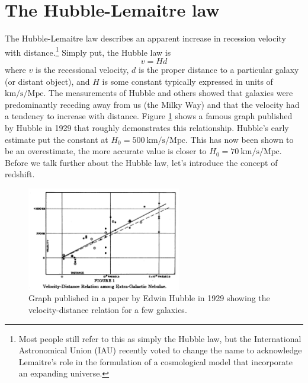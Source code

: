 \documentclass[a4paper,12pt]{article}
\theoremstyle{remark}
\newcommand{\mrm}[1]{\mathrm{#1}}
\renewcommand{\=}[1]{\stackrel{#1}{=}} %
\theoremstyle{plain}
\theoremstyle{definition}
\begin{document}
\section{The Hubble-Lemaitre law}
The Hubble-Lemaitre law describes an apparent increase in recession velocity with distance.\footnote{Most people still refer to this as simply the Hubble law, but the International Astronomical Union (IAU) recently voted to change the name to acknowledge Lemaitre's role in the formulation of a cosmological model that incorporate an expanding universe.} Simply put, the Hubble law is
\begin{equation}
v = H d
\end{equation}
where $v$ is the recessional velocity, $d$ is the proper distance to a particular galaxy (or distant object), and $H$ is some constant typically expressed in units of $\mrm{km /  s / Mpc}$. The measurements of Hubble and others showed that galaxies were predominantly receding away from us (the Milky Way) and that the velocity had a tendency to increase with distance. Figure \ref{fig:hubble} shows a famous graph published by Hubble in 1929 that roughly demonstrates this relationship. Hubble's early estimate put the constant at $H_0 = 500 \: \mrm{km /  s / Mpc}$. This has now been shown to be an overestimate, the more accurate value is closer to $H_0 = 70 \:\mrm{km /  s / Mpc}$. Before we talk further about the Hubble law, let's introduce the concept of redshift. 

\begin{figure}[t]
\begin{center}
    \includegraphics*[angle=0,width=0.6\textwidth]{img/hubble_relation.png}
    \caption[Insert text]{Graph published in a paper by Edwin Hubble in 1929 showing the velocity-distance relation for a few galaxies.}
\label{fig:hubble}
\end{center}
\end{figure}
\end{document}
